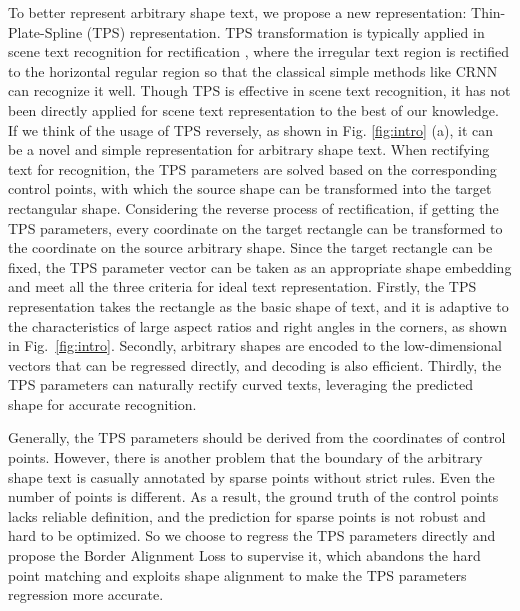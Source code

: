 \documentclass[sigconf]{acmart}
\begin{document}
	To better represent arbitrary shape text, we propose a new representation: Thin-Plate-Spline (TPS) representation. TPS transformation  \cite{bookstein1989principal} is typically applied in scene text recognition for rectification   \cite{shi2016robust, shi2018aster, zhan2019esir,yang2019symmetry, shang2020character,qz1}, where the irregular text region is rectified to the horizontal regular region so that the classical simple methods like CRNN   \cite{crnn} can recognize it well. Though TPS is effective in scene text recognition,  it has not been directly applied for scene text representation to the best of our knowledge.
	If we think of the usage of TPS reversely, as shown in Fig. \ref{fig:intro} (a), it can be a novel and simple representation for arbitrary shape text.  
	When rectifying text for recognition, the TPS parameters are solved based on the corresponding control points, with which the source shape can be transformed into the target rectangular shape. Considering the reverse process of rectification, if getting the TPS parameters, every coordinate on the target rectangle can be transformed to the coordinate on the source arbitrary shape. Since the target rectangle can be fixed, the TPS parameter vector can be taken as an appropriate shape embedding and meet all the three criteria for ideal text representation. Firstly, the TPS representation takes the rectangle as the basic shape of text, and it is adaptive to the characteristics of large aspect ratios and right angles in the corners, as shown in Fig.~\ref{fig:intro}. Secondly, arbitrary shapes are encoded to the low-dimensional vectors that can be regressed directly, and decoding is also efficient. Thirdly, the TPS parameters can naturally rectify curved texts, leveraging the predicted shape for accurate recognition.
	
	Generally, the TPS parameters should be derived from the coordinates of control points. However, there is another problem that the boundary of the arbitrary shape text is casually annotated by sparse points without strict rules. Even the number of points is different. As a result, the ground truth of the control points lacks reliable definition, and the prediction for sparse points is not robust and hard to be optimized. So we choose to regress the TPS parameters directly and propose the Border Alignment Loss to supervise it, which abandons the hard point matching and exploits shape alignment to make the TPS parameters regression more accurate.
	
\end{document}
